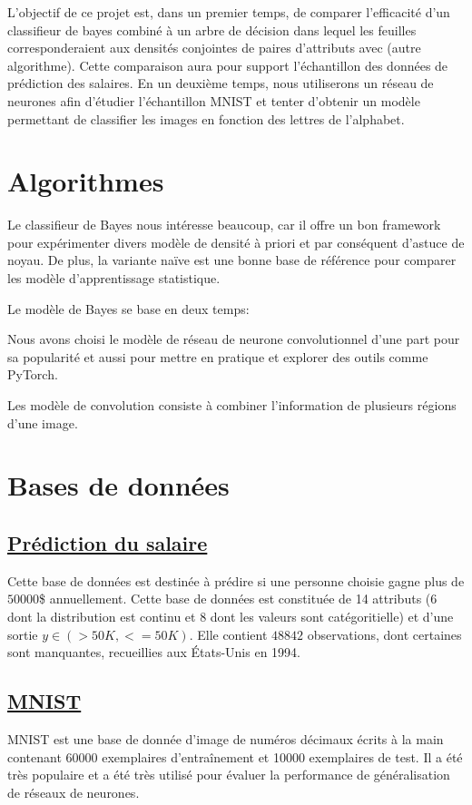\documentclass[11pt,letterpaper]{article}
\begin{document}
L'objectif de ce projet est, dans un premier temps, de comparer l'efficacité d'un classifieur de bayes combiné à un arbre de décision dans lequel les feuilles corresponderaient aux densités conjointes de paires d'attributs avec (autre algorithme). Cette comparaison aura pour support l'échantillon des données de prédiction des salaires. En un deuxième temps, nous utiliserons un réseau de neurones afin d'étudier l'échantillon MNIST et tenter d'obtenir un modèle permettant de classifier les images en fonction des lettres de l'alphabet.

\section{Algorithmes}

Le classifieur de Bayes nous intéresse beaucoup, car il offre un bon framework
pour expérimenter divers modèle de densité à priori et par conséquent d'astuce
de noyau. De plus, la variante naïve est une bonne base de référence pour
comparer les modèle d'apprentissage statistique.

Le modèle de Bayes se base en deux temps:

Nous avons choisi le modèle de réseau de neurone convolutionnel d'une part pour
sa popularité et aussi pour mettre en pratique et explorer des outils comme
PyTorch.

Les modèle de convolution consiste à combiner l'information de plusieurs
régions d'une image.

\section{Bases de données}
\subsection{\href{http://archive.ics.uci.edu/ml/datasets/Adult}{Prédiction du salaire}}

Cette base de données est destinée à prédire si une personne choisie gagne plus de $50 000$\$ annuellement. Cette base de données est constituée de 14 attributs (6 dont la distribution est continu et 8 dont les valeurs sont catégoritielle)
et d'une sortie $y \in \left( >50K, <=50K \right)$. Elle contient $48842$ observations, dont certaines sont manquantes, recueillies aux États-Unis en 1994.

\subsection{\href{http://yann.lecun.com/exdb/mnist/}{MNIST}}

MNIST est une base de donnée d'image de numéros décimaux écrits à la main
contenant 60000 exemplaires d'entraînement et 10000 exemplaires de test. Il a
été très populaire et a été très utilisé pour évaluer la performance de
généralisation de réseaux de neurones.
\end{document}
